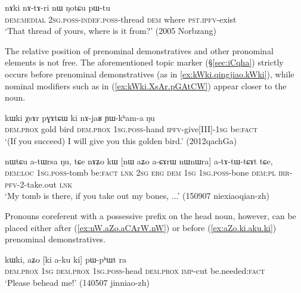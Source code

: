 \begin{exe}
\ex \label{ex:nAki.nAtAri}
 \gll nɤki nɤ-tɤ-ri nɯ ŋotɕu pɯ-tu \\
 \textsc{dem}:\textsc{medial} \textsc{2sg}.\textsc{poss}-\textsc{indef}.\textsc{poss}-thread \textsc{dem} where \textsc{pst}.\textsc{ipfv}-exist \\
\glt `That thread of yours, where is it from?' (2005 Norbzang)
\end{exe}

The relative position of prenominal demonstratives and other pronominal elements is not free. The aforementioned topic marker  (§\ref{sec:iCqha}) strictly occurs before prenominal demonstratives (as in \ref{ex:kWki.qingjiao.kWki}), while nominal modifiers such as  in (\ref{ex:kWki.XsAr.pGAtCW}) appear closer to the noun. 

\begin{exe}
\ex \label{ex:kWki.XsAr.pGAtCW}
 \gll kɯki χsɤr pɣɤtɕɯ ki nɤ-jaʁ ɲɯ-kʰam-a ŋu \\
\textsc{dem}.\textsc{prox} gold bird \textsc{dem}.\textsc{prox} \textsc{1sg}.\textsc{poss}-hand \textsc{ipfv}-give[III]-\textsc{1sg} be:\textsc{fact} \\
\glt `(If you succeed) I will give you this golden bird.' (2012qachGa)
\end{exe}

\begin{exe}
\ex \label{ex:nW.aZo.aCArW.nW}
 \gll nɯtɕu a-tɯrsa ŋu, tɕe nɤʑo kɯ [nɯ aʑo a-ɕɤrɯ nɯnɯra] a-tɤ-tɯ-tɕɤt tɕe, \\
 \textsc{dem}:\textsc{loc} \textsc{1sg}.\textsc{poss}-tomb be:\textsc{fact} \textsc{lnk} \textsc{2sg} \textsc{erg} \textsc{dem} \textsc{1sg} \textsc{1sg}.\textsc{poss}-bone \textsc{dem}:\textsc{pl} \textsc{irr}-\textsc{pfv}-2-take.out \textsc{lnk} \\
\glt `My tomb is there, if you take out my bones, ...' (150907 niexiaoqian-zh)
\end{exe}

Pronouns coreferent with a possessive prefix on the head noun, however, can be placed either after (\ref{ex:nW.aZo.aCArW.nW}) or before (\ref{ex:aZo.ki.aku.ki}) prenominal demonstratives.

\begin{exe}
\ex \label{ex:aZo.ki.aku.ki}
 \gll  kɯki, aʑo [ki a-ku ki] pɯ-pʰɯt ra \\
 \textsc{dem}.\textsc{prox} \textsc{1sg}  \textsc{dem}.\textsc{prox} \textsc{1sg}.\textsc{poss}-head  \textsc{dem}.\textsc{prox} \textsc{imp}-cut be.needed:\textsc{fact} \\
 \glt `Please behead me!' (140507 jinniao-zh)
\end{exe}

